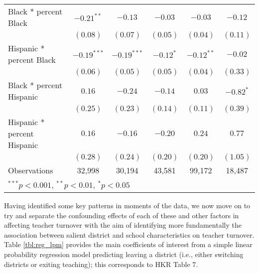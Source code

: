 \documentclass[12pt,]{article}
\begin{document}
\begin{sidewaystable}
\begin{center}
\begin{tabular}{l c c c c c }
\quad Black * percent Black                 & $-0.21^{**}$  & $-0.13$       & $-0.03$       & $-0.03$      & $-0.12$      \\
                                            & $(0.08)$      & $(0.07)$      & $(0.05)$      & $(0.04)$     & $(0.11)$     \\
\quad Hispanic * percent Black              & $-0.19^{***}$ & $-0.19^{***}$ & $-0.12^{*}$   & $-0.12^{**}$ & $-0.02$      \\
                                            & $(0.06)$      & $(0.05)$      & $(0.05)$      & $(0.04)$     & $(0.33)$     \\
\quad Black * percent Hispanic              & $0.16$        & $-0.24$       & $-0.14$       & $0.03$       & $-0.82^{*}$  \\
                                            & $(0.25)$      & $(0.23)$      & $(0.14)$      & $(0.11)$     & $(0.39)$     \\
\quad Hispanic * percent Hispanic           & $0.16$        & $-0.16$       & $-0.20$       & $0.24$       & $0.77$       \\
                                            & $(0.28)$      & $(0.24)$      & $(0.20)$      & $(0.20)$     & $(1.05)$     \\
\hline
Observations                                & 32,998         & 30,194         & 43,581         & 99,172        & 18,487        \\
\hline
\multicolumn{6}{l}{\scriptsize{$^{***}p<0.001$, $^{**}p<0.01$, $^*p<0.05$}}
\end{tabular}
\caption{Estimated Effects of Starting Teacher Salary and Student Demographic Characteristics on the Probability that Teachers Leave School Districts, by Experience (linear probability models; Huber-White standard  errors in parentheses)}
\label{tbl:reg_lpm}
\end{center}
\end{sidewaystable}

Having identified some key patterns in moments of the data, we now move
on to try and separate the confounding effects of each of these and
other factors in affecting teacher turnover with the aim of identifying
more fundamentally the association between salient district and school
characteristics on teacher turnover. Table \ref{tbl:reg_lpm} provides
the main coefficients of interest from a simple linear probability
regression model predicting leaving a district (i.e., either switching
districts or exiting teaching); this corresponds to HKR Table 7.
\end{document}

